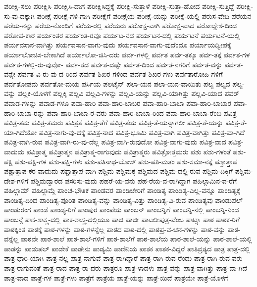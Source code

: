 {ಪರೀಕ್ಷಿ-ಸಲು
ಪರೀಕ್ಷಿಸಿ
ಪರೀಕ್ಷಿಸಿ-ದಾಗ
ಪರೀಕ್ಷಿಸಿದ್ದಕ್ಕೆ
ಪರೀಕ್ಷಿ-ಸುತ್ತಾಳೆ
ಪರೀಕ್ಷಿ-ಸುತ್ತಾ-ಹೋದ
ಪರೀಕ್ಷಿ-ಸುತ್ತಿದ್ದೆ
ಪರೀಕ್ಷಿ-ಸು-ವು-ದಕ್ಕಾಗಿ
ಪರೀಕ್ಷೆ
ಪರೀಕ್ಷೆ-ಗಳಿ-ಗಾಗಿ
ಪರೀಕ್ಷೆಗೆ
ಪರೀಕ್ಷೆಯ
ಪರೀಕ್ಷೆ-ಯನ್ನು
ಪರೀಕ್ಷೆ-ಯಲ್ಲಿ
ಪರುಸ-ವೇದಿ
ಪರೆಯನ
ಪರೆಯ-ನನ್ನು
ಪರೆಯ-ನೊಂದಿಗೆ
ಪರೆಯ-ರಲ್ಲಿ
ಪರೆಯರು
ಪರೋಕ್ಷ-ವಾಗಿ
ಪರೋಕ್ಷ-ವಾದ
ಪರೋದ್ದೇಶ-ದಿಂದ
ಪರೋಪ-ಕಾರ
ಪರ್ಯಂತರ
ಪರ್ಯಂತ-ರವೂ
ಪರ್ಯಟ-ನದ
ಪರ್ಯಟನ-ದಲ್ಲಿ
ಪರ್ಯಟನೆ
ಪರ್ಯಟನೆ-ಯಲ್ಲಿ
ಪರ್ಯವಸಾನ-ವಾಗಿತ್ತು
ಪರ್ಯವಸಾನ-ವಾಗು-ವುದು
ಪರ್ಯವಸಾನ-ವಾಗು-ವುದೆಂದೂ
ಪರ್ಯಾಯದ್ವೀಪಕ್ಕೆ
ಪರ್ಯಾಲೋಚಿಸ-ಬೇಕಾಗಿದೆ
ಪರ್ಯಾಲೋ-ಚಿಸಿ-ದರು
ಪರ್ವ-ಗಳಲ್ಲಿ
ಪರ್ವತ
ಪರ್ವ-ತಕ್ಕೂ
ಪರ್ವ-ತಕ್ಕೆ
ಪರ್ವತ-ಗಳ
ಪರ್ವತ-ಗಳಲ್ಲಿ-ರು-ವುವೋ-
ಪರ್ವ-ತದ
ಪರ್ವತ-ದಷ್ಟೇ
ಪರ್ವತ-ದಿಂದ
ಪರ್ವತ-ನಗರಿಗೆ
ಪರ್ವತ-ವನ್ನು
ಪರ್ವತ-ವನ್ನೇ
ಪರ್ವತ-ವಿ-ರು-ವು-ದ-ರಿಂದ
ಪರ್ವತ-ಶಿಖರ-ಗಳಿಂದ
ಪರ್ವತ-ಶಿಖರ-ಗಳು
ಪರ್ವತಾರೋಹಿ-ಗಳಿಗೆ
ಪರ್ವತೋಪಮ
ಪರ್ವತೋ-ಮಯ
ಪರ್ಸಿಯ
ಪಲಟೈನ್
ಪಲಾ-ಯನ
ಪಲಾ-ಯನ-ವಾಯಿತು
ಪಲ್ಯ
ಪಲ್ಯದ
ಪಲ್ಯ-ವನ್ನು
ಪಲ್ಲಕಿ-ಯೊಳಗೆ
ಪಲ್ಲಕ್ಕಿ
ಪಲ್ಲವಿ
ಪಲ್ಲವಿ-ಗಳನ್ನು
ಪಲ್ಲವಿ-ಯನ್ನು
ಪಲ್ಲವಿ-ಯಾಗಿತ್ತು
ಪಲ್ಲವಿ-ಯಾದ
ಪವರ್
ಪವಾಡ-ಗಳನ್ನು
ಪವಾಡ-ಗಳೂ
ಪವಾ-ಹಾರಿ
ಪವಾ-ಹಾರಿ-ಬಾಬರ
ಪವಾ-ಹಾರಿ-ಬಾಬಾ
ಪವಾ-ಹಾರಿ-ಬಾಬಾರ
ಪವಾ-ಹಾರಿ-ಬಾಬಾ-ರನ್ನು
ಪವಾ-ಹಾರಿ-ಬಾಬಾ-ರ-ವರು
ಪವಾ-ಹಾರಿ-ಬಾಬಾ-ರಿಂದ
ಪವಾ-ಹಾರಿ-ಬಾಬಾ-ರೆಂಬ
ಪವಿತ್ರ
ಪವಿತ್ರ-ತಮ
ಪವಿತ್ರ-ತಮರು
ಪವಿತ್ರತೆ
ಪವಿತ್ರ-ತೆಗೆ
ಪವಿತ್ರ-ತೆಯ
ಪವಿತ್ರ-ತೆ-ಯನ್ನಾಗಲೀ
ಪವಿತ್ರ-ತೆ-ಯನ್ನು
ಪವಿತ್ರ-ತೆ-ಯಾ-ಗಿದೆಯೋ
ಪವಿತ್ರ-ನಾಗು-ವು-ದಕ್ಕೆ
ಪವಿತ್ರ-ನಾದ
ಪವಿತ್ರ-ಭೂಮಿ
ಪವಿತ್ರ-ವಾಗಿ
ಪವಿತ್ರ-ವಾಗಿತ್ತು
ಪವಿತ್ರ-ವಾ-ಗಿದೆ
ಪವಿತ್ರ-ವಾಗಿ-ರುವ
ಪವಿತ್ರ-ವಾಗಿ-ರು-ವು-ದೆಲ್ಲ
ಪವಿತ್ರ-ವಾಗಿ-ರುವುದೋ
ಪವಿತ್ರ-ವಾಗು-ವುದು
ಪವಿತ್ರ-ವಾದ
ಪವಿತ್ರ-ವಾದುದು
ಪವಿತ್ರಾತ್ಮ
ಪವಿತ್ರಾತ್ಮನ
ಪವಿತ್ರಾತ್ಮ-ರಾಗುವುದು
ಪವಿತ್ರಾತ್ಮರು
ಪವಿತ್ರೋತ್ತಮರು
ಪಶು
ಪಶು-ಗಳಂತೆ
ಪಶು-ಪಕ್ಷಿ
ಪಶು-ಪಕ್ಷಿ-ಗಳ
ಪಶು-ಪಕ್ಷಿ-ಗಳು
ಪಶು-ಪತಿನಾಥ-ಬೋಸ್
ಪಶು-ಪತಿ-ಮತಂ
ಪಶು-ಸಮಾ-ನಕ್ಕೆ
ಪಶ್ಚಾತ್ತಾಪ
ಪಶ್ಚಾತ್ತಾಪ-ಕರ-ವಾದುದು
ಪಶ್ಚಾತ್ತಾಪ-ವಾಗಿ
ಪಶ್ಚಿಮ
ಪಶ್ಚಿಮಕ್ಕೆ
ಪಶ್ಚಿಮದ
ಪಶ್ಚಿಮ-ದಲ್ಲಿ-ರುವ
ಪಶ್ಚಿಮ-ದಿಕ್ಕಿಗೆ
ಪಶ್ಚಿಮ-ದೇಶ-ಗಳಿಗೆ
ಪಶ್ಚಿಮದ್ವಾರದ
ಪಸರಿಸು-ವುದು
ಪಹರೆ-ಯ-ವನು
ಪಹ-ರೆಯ-ವ-ರಾಗಿದ್ದಾಗ
ಪಹಿಲ್ಗಾಮಿನ-ವ-ರೆಗೆ
ಪಹಿಲ್ಗಾಮ್
ಪಹಿಲ್ಗಾಮ್ಗೆ
ಪಾಂಚ-ಭೌತಿಕ
ಪಾಂಡವರ
ಪಾಂಡಿಚೇರಿಗೆ
ಪಾಂಡಿತ್ಯ
ಪಾಂಡಿತ್ಯ-ಎಲ್ಲ-ವನ್ನೂ
ಪಾಂಡಿತ್ಯಕ್ಕೆ
ಪಾಂಡಿತ್ಯ-ದಿಂದ
ಪಾಂಡಿತ್ಯ-ಪೂರಿತ
ಪಾಂಡಿತ್ಯ-ವನ್ನು
ಪಾಂಡಿತ್ಯ-ವಿತ್ತು
ಪಾಂಡಿತ್ಯ-ವಿ-ರುವ
ಪಾಂಡಿತ್ಯವು
ಪಾಂಡುಪಲ್
ಪಾಂಡುರಂಗ
ಪಾಂಡೆ
ಪಾಂಡ್ಯ-ರಿಗೆ
ಪಾಂಪುರ
ಪಾಂಪೆಯ
ಪಾಂಬನ್
ಪಾಂಬನ್ನಿಗೆ
ಪಾಂಬನ್ನಿ-ನಲ್ಲಿ
ಪಾಂಬನ್ನಿ-ನಿಂದ
ಪಾಂಬನ್ಗೆ
ಪಾಕ-ಶಾಸ್ತ್ರ-ದಲ್ಲಿ
ಪಾಕ-ಶಾಸ್ತ್ರ-ದಲ್ಲಿಯೂ
ಪಾಚಿ
ಪಾಚೀ
ಪಾಟಲೀಪುತ್ರ-ವೆಂಬ
ಪಾಟ್ನಾ
ಪಾಠ
ಪಾಠಕ-ರಿಗೆ
ಪಾಠಕ್ಕಿಂತ
ಪಾಠಕ್ಕೆ
ಪಾಠ-ಗಳನ್ನು
ಪಾಠ-ಗಳನ್ನೆಲ್ಲ
ಪಾಠದ
ಪಾಠ-ದಲ್ಲಿ
ಪಾಠಪ್ರ-ವ-ಚನ-ಗಳನ್ನು
ಪಾಠ-ವನ್ನು
ಪಾಠ-ವನ್ನೆಲ್ಲ
ಪಾಠವೇ
ಪಾಠ-ಶಾಲೆ
ಪಾಠ-ಶಾಲೆ-ಗಳಿಗೆ
ಪಾಠ-ಶಾಲೆಗೆ
ಪಾಠ-ಶಾಲೆಯ
ಪಾಠ-ಶಾಲೆ-ಯನ್ನು
ಪಾಠ-ಶಾಲೆ-ಯಲ್ಲಿ
ಪಾಡನ್ನು
ಪಾಡುಪಲ್
ಪಾಡೇಕೆ
ಪಾಡೇನು
ಪಾಡ್ಯಮಿ
ಪಾಣಿನಿಯ
ಪಾತಕ
ಪಾತಕ-ವಿದ್ದರೆ
ಪಾತಿವ್ರತ್ಯದ
ಪಾತ್ರ
ಪಾತ್ರ-ದಲ್ಲಿ
ಪಾತ್ರ-ಧಾರಿ-ಯಾಗಿ
ಪಾತ್ರ-ನಲ್ಲ
ಪಾತ್ರ-ನಾಗುವೆ
ಪಾತ್ರ-ರಾಗಿದ್ದಾರೆ
ಪಾತ್ರ-ರಾಗಿ-ರುವ-ರೆಂದು
ಪಾತ್ರ-ರಾಗಿ-ರುವ-ವರು
ಪಾತ್ರ-ರಾಗುವಂತೆ
ಪಾತ್ರ-ರಾದ
ಪಾತ್ರ-ರಾ-ದರು
ಪಾತ್ರರೂ
ಪಾತ್ರ-ಳಾದಳು
ಪಾತ್ರ-ವನ್ನು
ಪಾತ್ರ-ವಾಗಿತ್ತು
ಪಾತ್ರ-ವಾ-ಗಿದೆ
ಪಾತ್ರ-ವಾದ
ಪಾತ್ರೆ-ಗಳ
ಪಾತ್ರೆ-ಗಳು
ಪಾತ್ರೆಗೆ
ಪಾತ್ರೆಯ
ಪಾತ್ರೆ-ಯನ್ನು
ಪಾತ್ರೆ-ಯಿದೆ
ಪಾತ್ರೆಯೇ
ಪಾತ್ರೆ-ಯೊಳಗೆ
}
